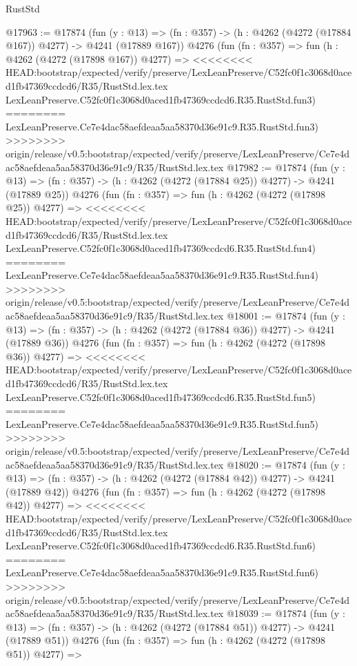 \begin{lexlean}{RustStd}
\begin{coremodule}
{\begin{coremodule}
{{{{{{{{{{{{{{{{@17963 := @17874
    (fun (y : @13) => (fn : @357) -> (h : @4262 (@4272 (@17884 @167)) @4277) -> @4241 (@17889 @167))
    @4276
    (fun (fn : @357) =>
    fun (h : @4262 (@4272 (@17898 @167)) @4277) =>
<<<<<<<< HEAD:bootstrap/expected/verify/preserve/LexLeanPreserve/C52fc0f1c3068d0aced1fb47369ccdcd6/R35/RustStd.lex.tex
    LexLeanPreserve.C52fc0f1c3068d0aced1fb47369ccdcd6.R35.RustStd.fun3)
========
    LexLeanPreserve.Ce7e4dac58aefdeaa5aa58370d36e91c9.R35.RustStd.fun3)
>>>>>>>> origin/release/v0.5:bootstrap/expected/verify/preserve/LexLeanPreserve/Ce7e4dac58aefdeaa5aa58370d36e91c9/R35/RustStd.lex.tex
@17982 := @17874
    (fun (y : @13) => (fn : @357) -> (h : @4262 (@4272 (@17884 @25)) @4277) -> @4241 (@17889 @25))
    @4276
    (fun (fn : @357) =>
    fun (h : @4262 (@4272 (@17898 @25)) @4277) =>
<<<<<<<< HEAD:bootstrap/expected/verify/preserve/LexLeanPreserve/C52fc0f1c3068d0aced1fb47369ccdcd6/R35/RustStd.lex.tex
    LexLeanPreserve.C52fc0f1c3068d0aced1fb47369ccdcd6.R35.RustStd.fun4)
========
    LexLeanPreserve.Ce7e4dac58aefdeaa5aa58370d36e91c9.R35.RustStd.fun4)
>>>>>>>> origin/release/v0.5:bootstrap/expected/verify/preserve/LexLeanPreserve/Ce7e4dac58aefdeaa5aa58370d36e91c9/R35/RustStd.lex.tex
@18001 := @17874
    (fun (y : @13) => (fn : @357) -> (h : @4262 (@4272 (@17884 @36)) @4277) -> @4241 (@17889 @36))
    @4276
    (fun (fn : @357) =>
    fun (h : @4262 (@4272 (@17898 @36)) @4277) =>
<<<<<<<< HEAD:bootstrap/expected/verify/preserve/LexLeanPreserve/C52fc0f1c3068d0aced1fb47369ccdcd6/R35/RustStd.lex.tex
    LexLeanPreserve.C52fc0f1c3068d0aced1fb47369ccdcd6.R35.RustStd.fun5)
========
    LexLeanPreserve.Ce7e4dac58aefdeaa5aa58370d36e91c9.R35.RustStd.fun5)
>>>>>>>> origin/release/v0.5:bootstrap/expected/verify/preserve/LexLeanPreserve/Ce7e4dac58aefdeaa5aa58370d36e91c9/R35/RustStd.lex.tex
@18020 := @17874
    (fun (y : @13) => (fn : @357) -> (h : @4262 (@4272 (@17884 @42)) @4277) -> @4241 (@17889 @42))
    @4276
    (fun (fn : @357) =>
    fun (h : @4262 (@4272 (@17898 @42)) @4277) =>
<<<<<<<< HEAD:bootstrap/expected/verify/preserve/LexLeanPreserve/C52fc0f1c3068d0aced1fb47369ccdcd6/R35/RustStd.lex.tex
    LexLeanPreserve.C52fc0f1c3068d0aced1fb47369ccdcd6.R35.RustStd.fun6)
========
    LexLeanPreserve.Ce7e4dac58aefdeaa5aa58370d36e91c9.R35.RustStd.fun6)
>>>>>>>> origin/release/v0.5:bootstrap/expected/verify/preserve/LexLeanPreserve/Ce7e4dac58aefdeaa5aa58370d36e91c9/R35/RustStd.lex.tex
@18039 := @17874
    (fun (y : @13) => (fn : @357) -> (h : @4262 (@4272 (@17884 @51)) @4277) -> @4241 (@17889 @51))
    @4276
    (fun (fn : @357) =>
    fun (h : @4262 (@4272 (@17898 @51)) @4277) =>
}}}}}}}}}}}}}}}}
\end{coremodule}}
\end{coremodule}
\end{lexlean}
